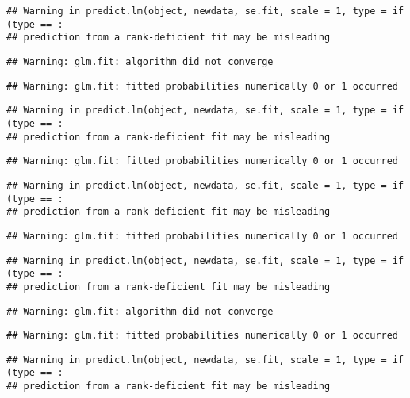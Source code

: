 \documentclass[
]{article}
\begin{document}
\begin{verbatim}
## Warning in predict.lm(object, newdata, se.fit, scale = 1, type = if (type == :
## prediction from a rank-deficient fit may be misleading
\end{verbatim}

\begin{verbatim}
## Warning: glm.fit: algorithm did not converge
\end{verbatim}

\begin{verbatim}
## Warning: glm.fit: fitted probabilities numerically 0 or 1 occurred
\end{verbatim}

\begin{verbatim}
## Warning in predict.lm(object, newdata, se.fit, scale = 1, type = if (type == :
## prediction from a rank-deficient fit may be misleading
\end{verbatim}

\begin{verbatim}
## Warning: glm.fit: fitted probabilities numerically 0 or 1 occurred
\end{verbatim}

\begin{verbatim}
## Warning in predict.lm(object, newdata, se.fit, scale = 1, type = if (type == :
## prediction from a rank-deficient fit may be misleading
\end{verbatim}

\begin{verbatim}
## Warning: glm.fit: fitted probabilities numerically 0 or 1 occurred
\end{verbatim}

\begin{verbatim}
## Warning in predict.lm(object, newdata, se.fit, scale = 1, type = if (type == :
## prediction from a rank-deficient fit may be misleading
\end{verbatim}

\begin{verbatim}
## Warning: glm.fit: algorithm did not converge
\end{verbatim}

\begin{verbatim}
## Warning: glm.fit: fitted probabilities numerically 0 or 1 occurred
\end{verbatim}

\begin{verbatim}
## Warning in predict.lm(object, newdata, se.fit, scale = 1, type = if (type == :
## prediction from a rank-deficient fit may be misleading
\end{verbatim}
\end{document}
